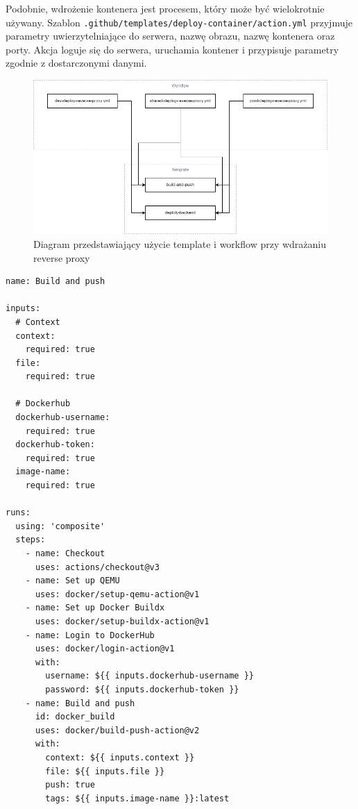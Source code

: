\documentclass{article}
\begin{document}
Podobnie, wdrożenie kontenera jest procesem, który może być wielokrotnie używany. Szablon \lstinline|.github/templates/deploy-container/action.yml| przyjmuje parametry uwierzytelniające do serwera, nazwę obrazu, nazwę kontenera oraz porty. Akcja loguje się do serwera, uruchamia kontener i przypisuje parametry zgodnie z dostarczonymi danymi.

\begin{figure}[H]
    \centering
    \includegraphics[width=1\linewidth]{reverseProxyTemplatesSchema.png}
    \caption{Diagram przedstawiający użycie template i workflow przy wdrażaniu reverse proxy}
    \label{fig:enter-label}
\end{figure}

\begin{lstlisting}[caption=Plik \texttt{.github/templates/build-and-push/action.yml}]
name: Build and push

inputs:
  # Context
  context:
    required: true
  file:
    required: true

  # Dockerhub
  dockerhub-username:
    required: true
  dockerhub-token:
    required: true
  image-name:
    required: true

runs:
  using: 'composite'
  steps:
    - name: Checkout
      uses: actions/checkout@v3
    - name: Set up QEMU
      uses: docker/setup-qemu-action@v1
    - name: Set up Docker Buildx
      uses: docker/setup-buildx-action@v1
    - name: Login to DockerHub
      uses: docker/login-action@v1
      with:
        username: ${{ inputs.dockerhub-username }}
        password: ${{ inputs.dockerhub-token }}
    - name: Build and push
      id: docker_build
      uses: docker/build-push-action@v2
      with:
        context: ${{ inputs.context }}
        file: ${{ inputs.file }}
        push: true
        tags: ${{ inputs.image-name }}:latest
\end{lstlisting}
\end{document}

